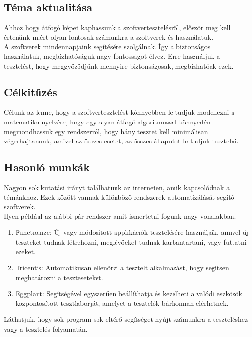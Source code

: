 \documentclass[12pt]{article}
\begin{document}
\subsection{Téma aktualitása}

Ahhoz hogy átfogó képet kaphassunk a szoftvertesztelésről, először meg kell értenünk miért olyan fontosak számunkra a szoftverek és használatuk.\\ 
A szoftverek mindennapjaink segítésére szolgálnak. Így a biztonságos használatuk, megbízhatóságuk nagy fontosságot élvez. Erre használjuk a tesztelést, hogy meggyőződjünk mennyire biztonságosak, megbízhatóak ezek.\\

\subsection{Célkitűzés}

Célunk az lenne, hogy a szoftvertesztelést könnyebben le tudjuk modellezni a matematika nyelvére, hogy egy olyan átfogó algoritmussal könnyedén megmondhassuk egy rendszerről, hogy hány tesztet kell minimálisan végrehajtanunk, amivel az összes esetet, az összes állapotot le tudjuk tesztelni.\\

\subsection{Hasonló munkák}

Nagyon sok kutatási irányt találhatunk az interneten, amik kapcsolódnak a témánkhoz. Ezek között vannak különböző rendszerek automatizálását segítő szoftverek.\\
Ilyen például az alábbi pár rendszer amit ismertetni fogunk nagy vonalakban.

\begin{enumerate}
\item Functionize: Új vagy módosított applikációk tesztelésére használják, amivel új teszteket tudnak létrehozni, meglévőeket tudnak karbantartani, vagy futtatni ezeket. 
\item Tricentis: Automatikusan ellenőrzi a tesztelt alkalmazást, hogy segítsen meghatározni a teszteseteket.
\item Eggplant: Segítségével egyszerűen beállíthatja és kezelheti a valódi eszközök központosított tesztlaborját, amelyet a tesztelők bárhonnan elérhetnek.
\end{enumerate}

Láthatjuk, hogy sok program sok eltérő segítséget nyújt számunkra a teszteléshez vagy a tesztelés folyamatán.\\
\end{document}
